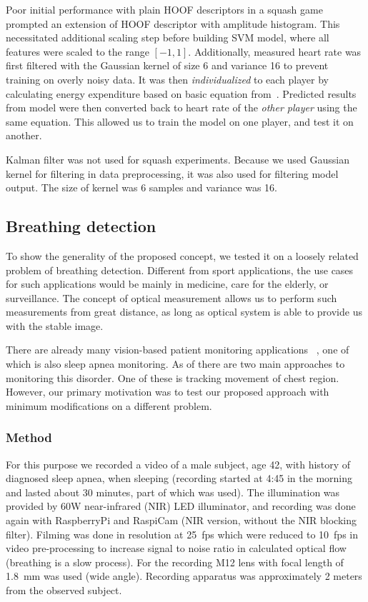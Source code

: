Poor initial performance with plain HOOF descriptors in a squash game prompted an extension of HOOF descriptor with amplitude histogram. This necessitated additional scaling step before building SVM model, where all features were scaled to the range $[-1, 1]$. Additionally, measured heart rate was first filtered with the Gaussian kernel of size \num{6} and variance \num{16} to prevent training on overly noisy data. It was then \emph{individualized} to each player by calculating energy expenditure based on basic equation from~\cite{charlot2014improvement}. Predicted results from model were then converted back to heart rate of the \emph{other player} using the same equation. This allowed us to train the model on one player, and test it on another. 

Kalman filter was not used for squash experiments. Because we used Gaussian kernel for filtering in data preprocessing, it was also used for filtering model output. The size of kernel was \num{6} samples and variance was \num{16}.

\subsection{Breathing detection}

To show the generality of the proposed concept, we tested it on a loosely related problem of breathing detection. Different from sport applications, the use cases for such applications would be mainly in medicine, care for the elderly, or surveillance. The concept of optical measurement allows us to perform such measurements from great distance, as long as optical system is able to provide us with the stable image. 

There are already many vision-based patient monitoring applications~ \cite{sathyanarayana2015vision}, one of which is also sleep apnea monitoring. As of \cite{sathyanarayana2015vision} there are two main approaches to monitoring this disorder. One of these is tracking movement of chest region. However, our primary motivation was to test our proposed approach with minimum modifications on a different problem.

\subsubsection{Method}
For this purpose we recorded a video of a male subject, age 42, with history of diagnosed sleep apnea, when sleeping (recording started at 4:45 in the morning and lasted about 30 minutes, part of which was used). The illumination was provided by 60W near-infrared (NIR) LED illuminator, and recording was done again with RaspberryPi and RaspiCam (NIR version, without the NIR blocking filter). Filming was done in  resolution at \SI{25}{fps} which were reduced to \SI{10}{fps} in video pre-processing to increase signal to noise ratio in calculated optical flow (breathing is a slow process). For the recording M12 lens with focal length of \SI{1.8}{mm} was used (wide angle). Recording apparatus was approximately 2 meters from the observed subject. 

